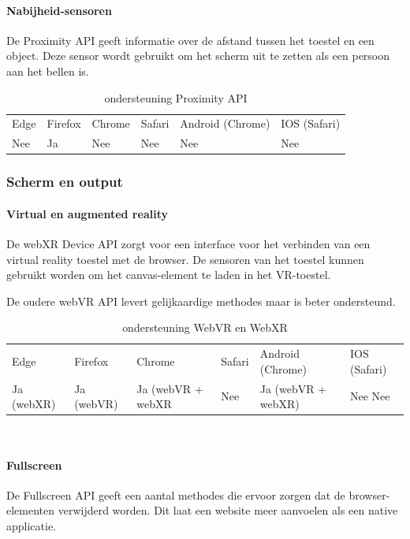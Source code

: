 			
\paragraph{Nabijheid-sensoren }
De Proximity API \autocite{Kostiainen2020a} geeft informatie over de afstand tussen het toestel en een object. Deze sensor wordt gebruikt om het scherm uit te zetten als een persoon aan het bellen is.

\begin{table}[H]
	\centering
	\begin{tabular}{llllll}
		Edge & Firefox & Chrome & Safari & Android (Chrome) & IOS (Safari) \\
		Nee   & Ja      &  Nee   & Nee     & Nee               & Nee          
	\end{tabular}	
	\caption{ondersteuning  Proximity API  }
\end{table}



\subsubsection{Scherm en output}
\paragraph{Virtual en augmented reality }
De webXR Device API \autocite{Jones2020} zorgt voor een interface voor het verbinden van een virtual reality toestel met de browser. De sensoren van het toestel kunnen gebruikt worden om het canvas-element te laden in het VR-toestel.

De oudere webVR API levert gelijkaardige methodes maar is beter ondersteund.

\begin{table}[H]
	\centering
	\begin{tabular}{llllll}
		Edge & Firefox & Chrome & Safari & Android (Chrome) & IOS (Safari) \\
		Ja (webXR)  & 	Ja (webVR)  &  	Ja (webVR + webXR  & Nee  & Ja (webVR + webXR) & Nee Nee          
	\end{tabular}	
	\caption{ondersteuning  WebVR en WebXR  }
\end{table}\

\paragraph{Fullscreen }
De Fullscreen API \autocite{Kesteren2020} geeft een aantal methodes die ervoor zorgen dat de browser-elementen verwijderd worden. Dit laat een website meer aanvoelen als een native applicatie.

